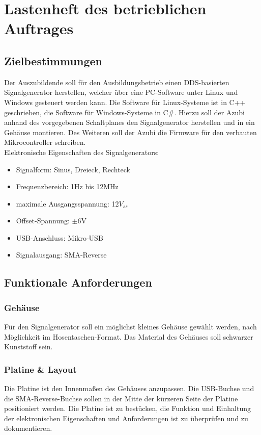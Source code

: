 \section[Lastenheft betriebl. Auftrag]{Lastenheft des betrieblichen Auftrages}

\subsection{Zielbestimmungen}
Der Auszubildende soll für den Ausbildungsbetrieb einen DDS-basierten Signalgenerator herstellen, welcher über eine PC-Software unter Linux und Windows gesteuert werden kann. Die Software für Linux-Systeme ist in C++ geschrieben, die Software für Windows-Systeme in C\#. Hierzu soll der Azubi anhand des vorgegebenen Schaltplanes den Signalgenerator herstellen und in ein Gehäuse montieren. Des Weiteren soll der Azubi die Firmware für den verbauten Mikrocontroller schreiben.\\
Elektronische Eigenschaften des Signalgenerators:
\begin{itemize}
\item Signalform: Sinus, Dreieck, Rechteck
\item Frequenzbereich: 1Hz bis 12MHz
\item maximale Ausgangsspannung: 12$V_{ss}$
\item Offset-Spannung: $\pm$6V
\item USB-Anschluss: Mikro-USB
\item Signalausgang: SMA-Reverse
\end{itemize}

\subsection{Funktionale Anforderungen}
\subsubsection{Gehäuse}
Für den Signalgenerator soll ein möglichst kleines Gehäuse gewählt werden, nach Möglichkeit im \glqq Hosentaschen-Format\grqq. Das Material des Gehäuses soll schwarzer Kunststoff sein.
\subsubsection{Platine \& Layout}
Die Platine ist den Innenmaßen des Gehäuses anzupassen. Die USB-Buchse und die SMA-Reverse-Buchse sollen in der Mitte der kürzeren Seite der Platine positioniert werden. Die Platine ist zu bestücken, die Funktion und Einhaltung der elektronischen Eigenschaften und Anforderungen ist zu überprüfen und zu dokumentieren.
